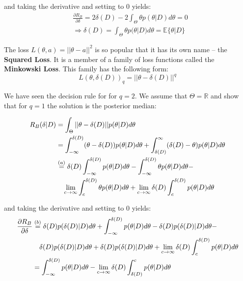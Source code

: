 \documentclass[]{article}
\theoremstyle{mattstyle}
\theoremstyle{definition}
\begin{document}
and taking the derivative and setting to 0 yields:
\begin{align*}
&\frac{\partial R_B}{\partial \delta} = 2\delta(D) -2\int_{\Theta}^{}\theta p(\theta|D)d\theta = 0 \\
&\Rightarrow \delta(D) = \int_{\Theta}^{}\theta p(\theta|D)d\theta = \mathbb{E}\{\theta|D\}
\end{align*}


The loss \(L(\theta,a) = ||\theta-a||^2\) is so popular that it has its own name -- the \textbf{Squared Loss}. It is a member of a family of loss functions called the \textbf{Minkowski Loss}. This family has the following form:
\begin{equation}
	L(\theta,\delta(D))_q = ||\theta-\delta(D)||^q
\end{equation}

We have seen the decision rule for for $q=2$. We assume that $\Theta=\mathbb{R}$ and show that for $q=1$ the solution is the posterior median:

\begin{align*}
R_B(\delta|D) &= \int_{\Theta}^{}||\theta-\delta(D)||p(\theta|D)d\theta \\
&= \int_{-\infty}^{\delta(D)}(\theta-\delta(D))p(\theta|D)d\theta + \int_{\delta(D)}^{\infty}(\delta(D)-\theta)p(\theta|D)d\theta\\
&\overset{(a)}{=} \delta(D)\int_{-\infty}^{\delta(D)}p(\theta|D)d\theta - \int_{-\infty}^{\delta(D)}\theta p(\theta|D)d\theta -\\
&\hspace{10px} \lim\limits_{c \rightarrow \infty} \int_{c}^{\delta(D)}\theta p(\theta|D)d\theta + \lim\limits_{c \rightarrow \infty} \delta(D)\int_{c}^{\delta(D)}p(\theta|D)d\theta
\end{align*}

and taking the derivative and setting to 0 yields:
\begin{align*}
\frac{\partial R_B}{\partial \delta} 
&\overset{(b)}{=} \delta(D)p(\delta(D)|D)d\theta + \int_{-\infty}^{\delta(D)}p(\theta|D)d\theta - \delta(D)p(\delta(D)|D)d\theta -\\
&\hspace{10px} \delta(D)p(\delta(D)|D)d\theta + \delta(D)p(\delta(D)|D)d\theta + \lim\limits_{c \rightarrow \infty} \delta(D)\int_{c}^{\delta(D)}p(\theta|D)d\theta \\
&= \int_{-\infty}^{\delta(D)}p(\theta|D)d\theta - \lim\limits_{c \rightarrow \infty} \delta(D)\int_{\delta(D)}^{c}p(\theta|D)d\theta
\end{align*}
\end{document}
